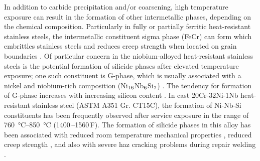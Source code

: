 
In addition to carbide precipitation and/or coarsening, high temperature exposure can result in the formation of other intermetallic phases, depending on the chemical composition.  Particularly in fully or partially ferritic heat-resistant stainless steels, the intermetallic constituent sigma phase (FeCr) can form which embrittles stainless steels and reduces creep strength when located on grain boundaries \cite{sourmail_precipitation_2001,avery_cast_1969}. Of particular concern in the niobium-alloyed heat-resistant stainless steels is the potential formation of silicide phases after elevated temperature exposure; one such constituent is G-phase, which is usually associated with a nickel and niobium-rich composition (Ni$_\textnormal{16}$Nb$_\textnormal{6}$Si$_\textnormal{7}$) \cite{sourmail_precipitation_2001}. The tendency for formation of G-phase increases with increasing silicon content \cite{ecob_formation_1987,pedro_ibanez_effects_1993}. In cast 20Cr-32Ni-1Nb heat-resistant stainless steel (ASTM A351 Gr. CT15C), the formation of Ni-Nb-Si constituents has been frequently observed after service exposure in the range of \SIrange[range-phrase=--]{760}{850}{\degreeCelsius} (1400\,\textdegree{}--1560\,\textdegree{}F). The formation of silicide phases in this alloy has been associated with reduced room temperature mechanical properties \cite{hoffman_high_2000-1,shibasaki_experience_1994}, reduced creep strength \cite{shibasaki_experience_1994}, and also with severe \gls{haz} cracking problems during repair welding \cite{hoffman_weld_1998,knowles_service_2004}.


